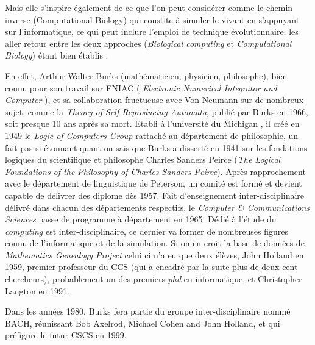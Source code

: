 

Mais elle s'inspire également de ce que l'on peut considérer comme le chemin inverse (Computational Biology) qui constite à simuler le vivant en s'appuyant sur l'informatique, ce qui peut inclure l'emploi de technique évolutionnaire, les aller retour entre les deux approches (\textit{Biological computing} et \textit{Computational Biology}) étant bien établis \autocite{Giavitto2002,Hogeweg1992} .


En effet, Arthur Walter Burks (mathématicien, physicien, philosophe), bien connu pour son travail sur ENIAC ( \textit{Electronic Numerical Integrator and Computer} ), et sa collaboration fructueuse avec Von Neumann sur de nombreux sujet, comme la \textit{Theory of Self-Reproducing Automata}, publié par Burks en 1966, soit presque 10 ans après sa mort. Etabli à l'université du Michigan , il créé en 1949 le \textit{Logic of Computers Group} rattaché au département de philosophie, un fait pas si étonnant quant on sais que Burks a disserté en 1941 sur les fondations logiques du scientifique et philosophe Charles Sanders Peirce (\textit{The Logical Foundations of the Philosophy of Charles Sanders Peirce}). Après rapprochement avec le département de linguistique de Peterson, un comité est formé et devient capable de délivrer des diplome dès 1957. Fait d'enseignement inter-disciplinaire délivré dans chacun des départements respectifs, le \textit{Computer \& Communications Sciences} passe de programme à département en 1965. Dédié à l'étude du \textit{computing} est inter-disciplinaire, ce dernier va former de nombreuses figures connu de l'informatique et de la simulation. Si on en croit la base de données de \textit{Mathematics Genealogy Project} celui ci n'a eu que deux élèves, John Holland en 1959, premier professeur du CCS (qui a encadré par la suite plus de deux cent chercheurs), probablement un des premiers \textit{phd} en informatique, et Christopher Langton en 1991.


Dans les années 1980, Burks fera partie du groupe inter-disciplinaire nommé BACH, réunissant Bob Axelrod, Michael Cohen and John Holland, et qui préfigure le futur CSCS en 1999.

